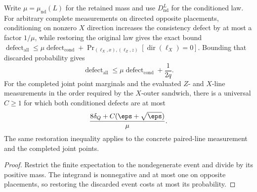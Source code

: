 \begin{lemma}
	\label{lem:qld-line-conditioning-restoration}
	\leanok
	Write $\mu=\mu_{\mathrm{nd}}(L)$ for the retained mass and use
	$D_{\mathrm{nd}}^L$ for the conditioned law. For arbitrary complete
	measurements on directed opposite placements, conditioning on nonzero $X$ direction
	increases the consistency defect by at most a factor $1/\mu$, while restoring
	the original law gives the exact bound
	$\operatorname{defect}_{\mathrm{all}}\leq
	\mu\operatorname{defect}_{\mathrm{cond}}+
	\Pr_{(\ell_X,x),(\ell_Z,z)}[\operatorname{dir}(\ell_X)=0]$.
	Bounding that discarded probability gives
	\[
		\operatorname{defect}_{\mathrm{all}}
		\leq \mu\operatorname{defect}_{\mathrm{cond}}+\frac1{2q}.
	\]
	For the completed joint point marginals and the evaluated $Z$- and $X$-line
	measurements in the order required by the $X$-outer sandwich, there is a
	universal $C\geq1$ for which both conditioned defects are at most
	\[
		\frac{8\delta_Q+C(\eps+\sqrt\eps)}{\mu}.
	\]
	The same restoration inequality applies to the concrete paired-line
	measurement and the completed joint points.
\end{lemma}
\begin{proof}
	\leanok
	Restrict the finite expectation to the nondegenerate event and divide by its
	positive mass. The integrand is nonnegative and at most one on opposite
	placements, so restoring the discarded event costs at most its probability.
\end{proof}

